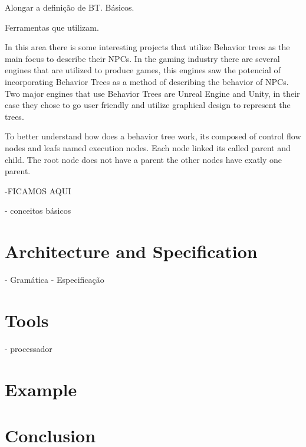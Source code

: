 \documentclass[a4paper,UKenglish,cleveref, autoref, thm-restate]{oasics-v2019}
\begin{document}
Alongar a definição de BT. Básicos.

Ferramentas que utilizam.


In this area there is some interesting projects that utilize Behavior trees as the main focus to describe their NPCs. 
In the gaming industry there are several engines that are utilized to produce games, this engines saw the potencial of incorporating Behavior Trees as a method of describing the behavior of NPCs.
Two major engines that use Behavior Trees are Unreal Engine and Unity, in their case they chose to go user friendly and utilize graphical design to represent the trees.

To better understand how does a behavior tree work, its composed of control flow nodes and leafs named execution nodes.
Each node linked its called parent and child. 
The root node does not have a parent the other nodes have exatly one parent.

-FICAMOS AQUI

- conceitos básicos

\section{Architecture and Specification}
\label{sec:arc-spec}

- Gramática
- Especificação


\section{Tools}
\label{sec:tools}
- processador

\section{Example}
\label{sec:example}

\section{Conclusion}
\label{sec:conclusion}


\end{document}
